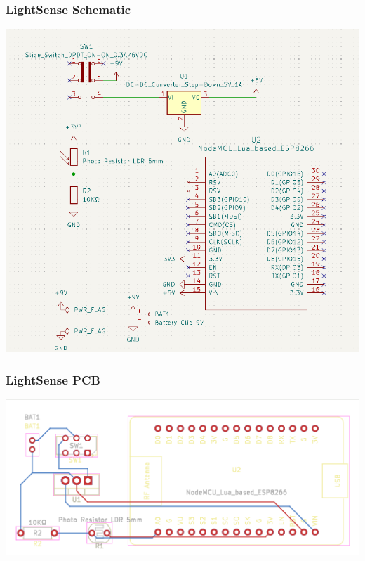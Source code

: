 \documentclass{beamer}
\begin{document}
\begin{frame}
\frametitle{LightSense Schematic}
	\centerline{\includegraphics[height=0.6\textwidth]{assets/lightsense-schematic}}
\end{frame}
\begin{frame}
\frametitle{LightSense PCB}
	\colorbox{PineGreen}{\centerline{\includegraphics[height=0.4\textwidth]{assets/LightSense-brd}}}
\end{frame}
\end{document}
